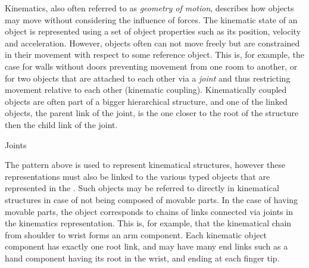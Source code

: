 Kinematics, also often referred to as \emph{geometry of motion}, describes how objects may move without considering the influence of forces.
The kinematic state of an object is represented using a set of object properties such as its position, velocity and acceleration.
However, objects often can not move freely but are constrained in their movement with respect to some reference object.
This is, for example, the case for walls without doors preventing movement from one room to another, or for two objects that are attached to each other via a \emph{joint} and thus restricting movement relative to each other (kinematic coupling).
Kinematically coupled objects are often part of a bigger hierarchical structure, and one of the linked objects, the parent link of the joint, is the one closer to the root of the structure then the child link of the joint.

\begin{ODP}{Joints}
\end{ODP}

The pattern above is used to represent kinematical structures, however these representations must also be linked to the various typed objects that are represented in the \neembak.
Such objects may be referred to directly in kinematical structures in case of not being composed of movable parts.
In the case of having movable parts, the object corresponds to chains of links connected via joints in the kinematics representation.
This is, for example, that the kinematical chain from shoulder to wrist forms an arm component.
Each kinematic object component has exactly one root link, and may have many end links such as a hand component having its root in the wrist, and ending at each finger tip.

